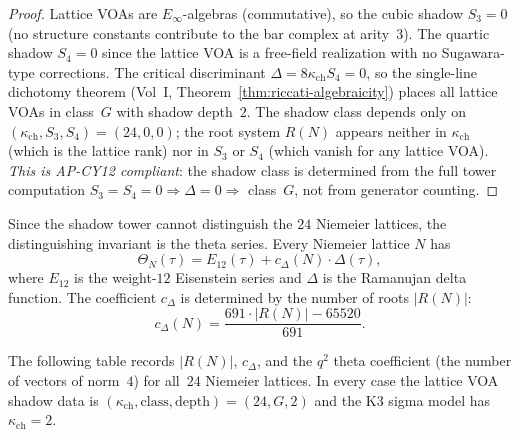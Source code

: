 \begin{proof}
Lattice VOAs are $E_\infty$-algebras (commutative), so the cubic shadow
$S_3 = 0$ (no structure constants contribute to the bar complex at
arity~$3$).  The quartic shadow $S_4 = 0$ since the lattice VOA is a
free-field realization with no Sugawara-type corrections.
The critical discriminant $\Delta = 8\kappa_{\mathrm{ch}} S_4 = 0$, so the
single-line dichotomy theorem (Vol~I,
Theorem~\ref{thm:riccati-algebraicity}) places all lattice VOAs in
class~$G$ with shadow depth~$2$.  The shadow class depends only on
$(\kappa_{\mathrm{ch}}, S_3, S_4) = (24, 0, 0)$; the root system $R(N)$
appears neither in $\kappa_{\mathrm{ch}}$ (which is the lattice rank) nor
in $S_3$ or $S_4$ (which vanish for any lattice VOA).  \emph{This is
AP-CY12 compliant}: the shadow class is determined from the full tower
computation $S_3 = S_4 = 0 \Rightarrow \Delta = 0 \Rightarrow$ class~$G$,
not from generator counting.
\end{proof}

\begin{remark}
\label{rem:niemeier-theta-distinguishing}
Since the shadow tower cannot distinguish the $24$ Niemeier lattices,
the distinguishing invariant is the theta series.  Every Niemeier lattice
$N$ has
\[
 \Theta_N(\tau) = E_{12}(\tau) + c_\Delta(N) \cdot \Delta(\tau),
\]
where $E_{12}$ is the weight-$12$ Eisenstein series and $\Delta$ is the
Ramanujan delta function.  The coefficient $c_\Delta$ is determined by
the number of roots $|R(N)|$:
\[
 c_\Delta(N) = \frac{691 \cdot |R(N)| - 65520}{691}.
\]
\end{remark}

The following table records $|R(N)|$, $c_\Delta$, and the $q^2$ theta
coefficient (the number of vectors of norm~$4$) for all~$24$
Niemeier lattices.  In every case the lattice VOA shadow data is
$(\kappa_{\mathrm{ch}}, \text{class}, \text{depth}) = (24, G, 2)$ and the K3
sigma model has $\kappa_{\mathrm{ch}} = 2$.

